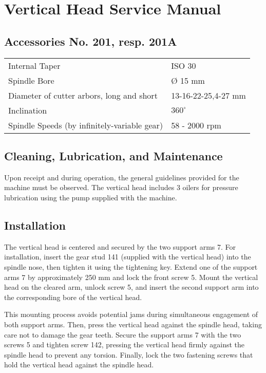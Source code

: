 \chapter{Vertical Head Service Manual}

\section*{Accessories No. 201, resp. 201A}

\begin{tabular}{ll}
    Internal Taper                               & ISO 30              \\
    Spindle Bore                                 & Ø 15 mm             \\
    Diameter of cutter arbors, long and short    & 13-16-22-25,4-27 mm \\
    Inclination                                  & \(360^\circ\)       \\
    Spindle Speeds (by infinitely-variable gear) & 58 - 2000 rpm       \\
\end{tabular}

\section*{Cleaning, Lubrication, and Maintenance}

Upon receipt and during operation, the general guidelines provided for the machine must be observed.
The vertical head includes 3 oilers for pressure lubrication using the pump supplied with the machine.

\section*{Installation}

The vertical head is centered and secured by the two support arms 7.
For installation, insert the gear stud 141 (supplied with the vertical head) into the spindle nose,
then tighten it using the tightening key. Extend one of the support arms 7 by approximately 250 mm and lock the front screw 5.
Mount the vertical head on the cleared arm, unlock screw 5, and insert the second support arm into the corresponding bore of the vertical head.

This mounting process avoids potential jams during simultaneous engagement of both support arms.
Then, press the vertical head against the spindle head, taking care not to damage the gear teeth.
Secure the support arms 7 with the two screws 5 and tighten screw 142, pressing the vertical head firmly against the spindle head to prevent any torsion.
Finally, lock the two fastening screws that hold the vertical head against the spindle head.

